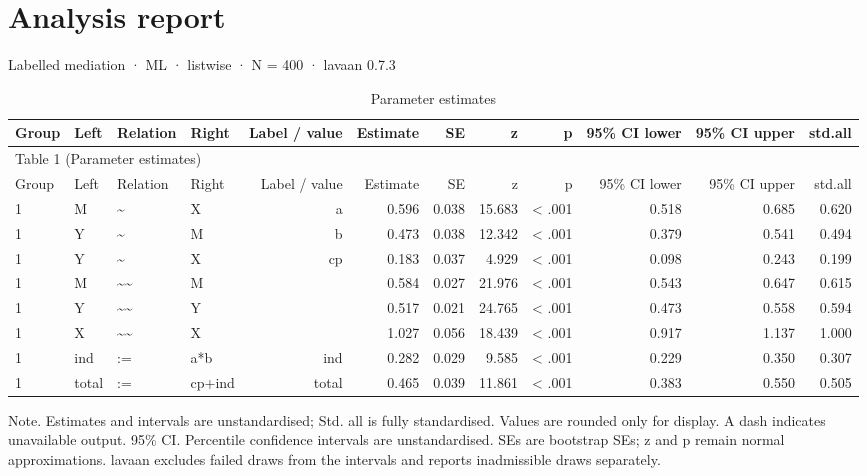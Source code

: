 \documentclass[11pt]{article}
\begin{document}
\section*{Analysis report}
Labelled mediation · ML · listwise · N = 400 · lavaan 0.7.3\par

\begin{landscape}
\small
\begin{longtable}{llllrrrrrrrr}
\caption{Parameter estimates}\\
\toprule
Group & Left & Relation & Right & Label / value & Estimate & SE & z & p & 95\% CI lower & 95\% CI upper & std.all \\
\midrule
\endfirsthead
\multicolumn{12}{l}{Table 1 (Parameter estimates)} \\
\toprule
Group & Left & Relation & Right & Label / value & Estimate & SE & z & p & 95\% CI lower & 95\% CI upper & std.all \\
\midrule
\endhead
1 & M & \textasciitilde{} & X & a & 0.596 & 0.038 & 15.683 & < .001 & 0.518 & 0.685 & 0.620 \\
1 & Y & \textasciitilde{} & M & b & 0.473 & 0.038 & 12.342 & < .001 & 0.379 & 0.541 & 0.494 \\
1 & Y & \textasciitilde{} & X & cp & 0.183 & 0.037 & 4.929 & < .001 & 0.098 & 0.243 & 0.199 \\
1 & M & \textasciitilde{}\textasciitilde{} & M &  & 0.584 & 0.027 & 21.976 & < .001 & 0.543 & 0.647 & 0.615 \\
1 & Y & \textasciitilde{}\textasciitilde{} & Y &  & 0.517 & 0.021 & 24.765 & < .001 & 0.473 & 0.558 & 0.594 \\
1 & X & \textasciitilde{}\textasciitilde{} & X &  & 1.027 & 0.056 & 18.439 & < .001 & 0.917 & 1.137 & 1.000 \\
1 & ind & := & a*b & ind & 0.282 & 0.029 & 9.585 & < .001 & 0.229 & 0.350 & 0.307 \\
1 & total & := & cp+ind & total & 0.465 & 0.039 & 11.861 & < .001 & 0.383 & 0.550 & 0.505 \\
\bottomrule
\end{longtable}
\noindent Note. Estimates and intervals are unstandardised; Std. all is fully standardised. Values are rounded only for display. A dash indicates unavailable output. 95\% CI. Percentile confidence intervals are unstandardised. SEs are bootstrap SEs; z and p remain normal approximations. lavaan excludes failed draws from the intervals and reports inadmissible draws separately.\par
\end{landscape}
\end{document}

